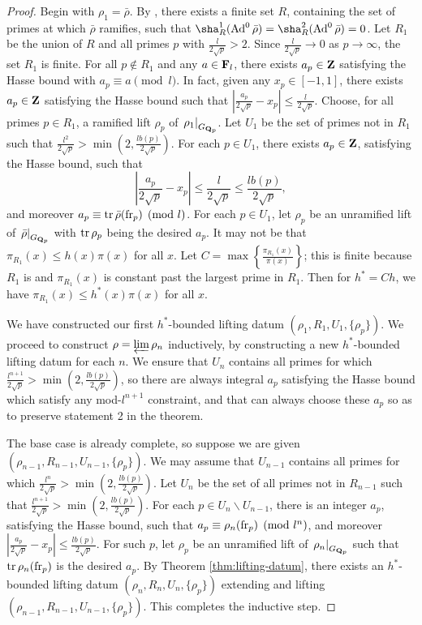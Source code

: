 \begin{proof}
Begin with $\rho_1= \bar\rho$. By \cite[Lem.~6]{khare-larsen-ramakrishna-2005}, 
there exists a finite set $R$, containing the set of primes at which $\bar\rho$ 
ramifies, such that $\sha_R^1(\Ad^0\bar\rho) = \sha_R^2(\Ad^0\bar\rho) = 0$. 
Let $R_1$ be the union of $R$ and all primes $p$ with 
$\frac{l}{2\sqrt p} > 2$. Since $\frac{l}{2\sqrt p} \to 0$ as $p\to \infty$, 
the set $R_1$ is finite. For all $p\notin R_1$ and any $a\in \mathbf{F}_l$, there 
exists $a_p\in \mathbf{Z}$ satisfying the Hasse bound with $a_p\equiv a\pmod l$. In 
fact, given any $x_p\in [-1,1]$, there exists $a_p\in \mathbf{Z}$ satisfying the Hasse 
bound such that 
$\left| \frac{a_p}{2\sqrt p} - x_p\right| \leqslant \frac{l}{2\sqrt p}$.
Choose, for all primes $p\in R_1$, a ramified 
lift $\rho_p$ of $\left. \rho_1\right|_{G_{\mathbf{Q}_p}}$. Let $U_1$ be the set of 
primes not in $R_1$ such that 
$\frac{l^2}{2\sqrt p} > \min\left(2, \frac{l b(p)}{2\sqrt p}\right)$. 
For each $p\in U_1$, there exists $a_p\in \mathbf{Z}$, satisfying the 
Hasse bound, such that 
\[
	\left| \frac{a_p}{2\sqrt p} - x_p\right| \leqslant \frac{l}{2\sqrt p} \leqslant \frac{l b(p)}{2\sqrt p} ,
\]
and moreover $a_p\equiv \operatorname{tr}\bar\rho(\mathrm{fr}_p)\pmod l$. For each $p\in U_1$, let 
$\rho_p$ be an unramified lift of $\left.\bar\rho\right|_{G_{\mathbf{Q}_p}}$ with 
$\operatorname{tr}\rho_p$ being the desired $a_p$. It may not be that 
$\pi_{R_1}(x) \leqslant h(x) \pi(x)$ for all $x$. Let 
$C = \max\left\{\frac{\pi_{R_1}(x)}{\pi(x)}\right\}$; this is finite because 
$R_1$ is and $\pi_{R_1}(x)$ is constant past the largest prime in $R_1$. Then 
for $h^\ast = C h$, we have $\pi_{R_1}(x) \leqslant h^\ast(x) \pi(x)$ for all 
$x$. 

We have constructed our first $h^\ast$-bounded lifting datum 
$(\rho_1,R_1,U_1,\{\rho_p\})$. We proceed to construct 
$\rho = \varprojlim \rho_n$ inductively, by constructing a new $h^\ast$-bounded 
lifting datum for each $n$. We ensure that $U_n$ contains all primes for which 
$\frac{l^{n+1}}{2\sqrt p} > \min\left(2, \frac{l b(p)}{2\sqrt p}\right)$, so 
there are always integral $a_p$ satisfying the Hasse bound which satisfy any 
mod-$l^{n+1}$ constraint, and that can always choose these $a_p$ so as to 
preserve statement 2 in the theorem. 

The base case is already complete, so suppose we are given 
$(\rho_{n-1},R_{n-1},U_{n-1},\{\rho_p\})$. We may assume that $U_{n-1}$ 
contains all primes for 
which $\frac{l^n}{2\sqrt p} > \min\left(2, \frac{l b(p)}{2\sqrt p}\right)$. Let 
$U_n$ be the set of all primes not in $R_{n-1}$ such that 
$\frac{l^{n+1}}{2\sqrt p} > \min\left(2, \frac{l b(p)}{2\sqrt p}\right)$. For 
each $p\in U_n\smallsetminus U_{n-1}$, there is an integer $a_p$, satisfying 
the Hasse bound, such that $a_p\equiv \rho_n(\mathrm{fr}_p)\pmod{l^n}$, and moreover 
$\left|\frac{a_p}{2\sqrt p} - x_p\right| \leqslant \frac{l b(p)}{2\sqrt p}$. 
For such $p$, let $\rho_p$ be an unramified lift of 
$\left. \rho_n\right|_{G_{\mathbf{Q}_p}}$ such that $\operatorname{tr}\rho_n(\mathrm{fr}_p)$ is the 
desired $a_p$. By Theorem \ref{thm:lifting-datum}, there exists an 
$h^\ast$-bounded lifting datum $(\rho_n,R_n,U_n,\{\rho_p\})$ extending and 
lifting $(\rho_{n-1},R_{n-1},U_{n-1},\{\rho_p\})$. This completes the inductive 
step.  
\end{proof}

